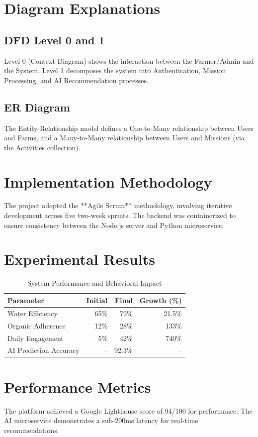 \documentclass[journal]{IEEEtran}
\begin{document}
\section{Diagram Explanations}
\subsection{DFD Level 0 and 1}
Level 0 (Context Diagram) shows the interaction between the Farmer/Admin and the System. Level 1 decomposes the system into Authentication, Mission Processing, and AI Recommendation processes.

\subsection{ER Diagram}
The Entity-Relationship model defines a One-to-Many relationship between Users and Farms, and a Many-to-Many relationship between Users and Missions (via the Activities collection).

\section{Implementation Methodology}
The project adopted the **Agile Scrum** methodology, involving iterative development across five two-week sprints. The backend was containerized to ensure consistency between the Node.js server and Python microservice.

\section{Experimental Results}
\begin{table}[htbp]
\caption{System Performance and Behavioral Impact}
\begin{center}
\begin{tabular}{@{}lrrr@{}}
\toprule
\textbf{Parameter} & \textbf{Initial} & \textbf{Final} & \textbf{Growth (\%)} \\ \midrule
Water Efficiency & 65\% & 79\% & 21.5\% \\
Organic Adherence & 12\% & 28\% & 133\% \\
Daily Engagement & 5\% & 42\% & 740\% \\
AI Prediction Accuracy & -- & 92.3\% & -- \\ \bottomrule
\end{tabular}
\end{center}
\end{table}

\section{Performance Metrics}
The platform achieved a Google Lighthouse score of 94/100 for performance. The AI microservice demonstrates a sub-200ms latency for real-time recommendations.
\end{document}
